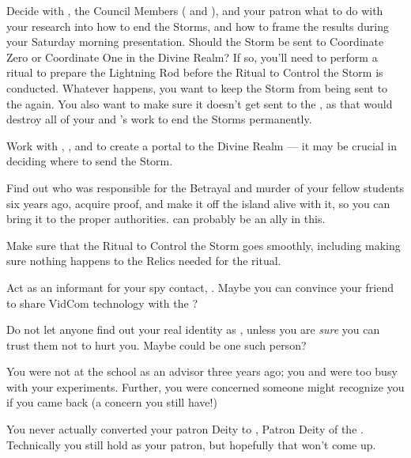 \documentclass[char]{GL2020}
\begin{document}
\begin{itemz}
    \item Decide with \cHeadScientist{}, the Council Members (\cAntiChup{} and \cTechStar{}), and your patron \cDiplomat{} what to do with your research into how to end the Storms, and how to frame the results during your Saturday morning presentation. Should the Storm be sent to Coordinate Zero or Coordinate One in the Divine Realm? If so, you'll need to perform a ritual to prepare the Lightning Rod before the Ritual to Control the Storm is conducted. Whatever happens, you want to keep the Storm from being sent to the \pShip{} again. You also want to make sure it doesn’t get sent to the \pTech{}, as that would destroy all of your and \cHeadScientist{}’s work to end the Storms permanently.
    \item Work with \cCurse{}, \cFlowPriest{}, and \cAmbition{} to create a portal to the Divine Realm — it may be crucial in deciding where to send the Storm.
    \item Find out who was responsible for the Betrayal and murder of your fellow students six years ago, acquire proof, and make it off the island alive with it, so you can bring it to the proper authorities. \cHeir{} can probably be an ally in this.
\end{itemz}

\begin{itemz}
    \item Make sure that the Ritual to Control the Storm goes smoothly, including making sure nothing happens to the Relics needed for the ritual. 
    \item Act as an informant for your \pShippie{} spy contact, \cBunker{}. Maybe you can convince your friend \cTechStar{} to share \cTechStar{\their} VidCom technology with the \pShippies{}?
    \item Do not let anyone find out your real identity as \cKidScientist{\full}, unless you are \emph{sure} you can trust them not to hurt you. Maybe \cMusic{} could be one such person? 
\end{itemz}

\begin{itemz}[Notes]
    \item You were not at the school as an advisor three years ago; you and \cHeadScientist{} were too busy with your experiments. Further, you were concerned someone might recognize you if you came back (a concern you still have!)
    \item You never actually converted your patron Deity to \cTechGod{\intro}, Patron Deity of the \pTech{}. Technically you still hold \cFarmGod{} as your patron, but hopefully that won't come up.
\end{itemz}
\end{document}
